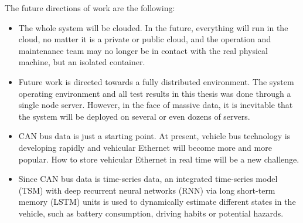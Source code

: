The future directions of work are the following:
\begin{itemize}
    \item The whole system will be clouded. In the future, everything will run in the cloud, no matter it is a private or public cloud, and the operation and maintenance team may no longer be in contact with the real physical machine, but an isolated container.
    
    \item Future work is directed towards a fully distributed environment. The system operating environment and all test results in this thesis was done through a single node server. However, in the face of massive data, it is inevitable that the system will be deployed on several or even dozens of servers.
    
    \item CAN bus data is just a starting point. At present, vehicle bus technology is developing rapidly and vehicular Ethernet will become more and more popular. How to store vehicular Ethernet in real time will be a new challenge.
    
    \item Since CAN bus data is time-series data, an integrated time-series model (TSM) with deep recurrent neural networks (RNN) via long short-term memory (LSTM) units is used to dynamically estimate different states in the vehicle, such as battery consumption, driving habits or potential hazards.
    
\end{itemize}

